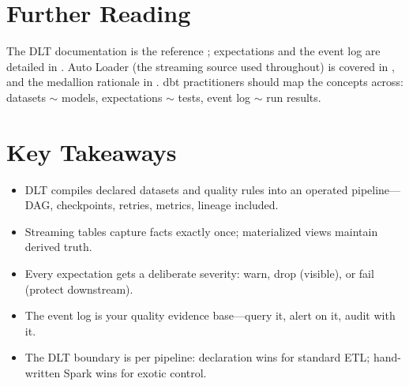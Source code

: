 \section{Further Reading}
The DLT documentation is the reference \cite{databricksDLT}; expectations and the event log are detailed in \cite{databricksDLTExpectations}. Auto Loader (the streaming source used throughout) is covered in \cite{databricksAutoLoader}, and the medallion rationale in \cite{databricksMedallion}. dbt practitioners should map the concepts across: datasets $\sim$ models, expectations $\sim$ tests, event log $\sim$ run results.

\section*{Key Takeaways}
\begin{itemize}
    \item DLT compiles declared datasets and quality rules into an operated pipeline---DAG, checkpoints, retries, metrics, lineage included.
    \item Streaming tables capture facts exactly once; materialized views maintain derived truth.
    \item Every expectation gets a deliberate severity: warn, drop (visible), or fail (protect downstream).
    \item The event log is your quality evidence base---query it, alert on it, audit with it.
    \item The DLT boundary is per pipeline: declaration wins for standard ETL; hand-written Spark wins for exotic control.
\end{itemize}

